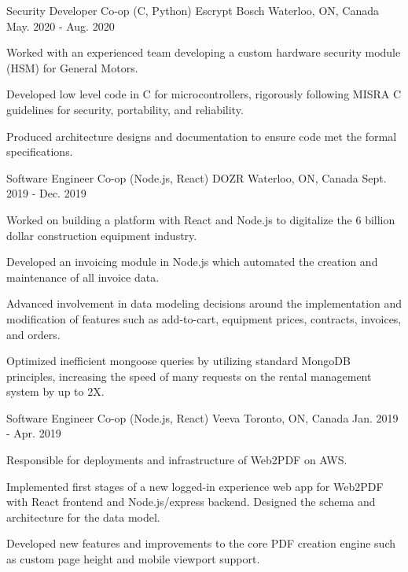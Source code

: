 \begin{cventries}
  \cventry
    {Security Developer Co-op (C, Python)} %
    {Escrypt Bosch} %
    {Waterloo, ON, Canada} %
    {May. 2020 - Aug. 2020} %
    {
      \begin{cvitems} %
\item Worked with an experienced team developing a custom hardware security module (HSM) for General Motors.
\item Developed low level code in C for microcontrollers, rigorously following MISRA C guidelines for security, portability, and reliability.
\item Produced architecture designs and documentation to ensure code met the formal specifications.
      \end{cvitems}
    }

  \cventry
    {Software Engineer Co-op (Node.js, React)} %
    {DOZR} %
    {Waterloo, ON, Canada} %
    {Sept. 2019 - Dec. 2019} %
    {
      \begin{cvitems} %
\item Worked on building a platform with React and Node.js to digitalize the 6 billion dollar construction equipment industry.
\item Developed an invoicing module in Node.js which automated the creation and maintenance of all invoice data.
\item Advanced involvement in data modeling decisions around the implementation and modification of features such as add-to-cart, equipment prices, contracts, invoices, and orders.
\item Optimized inefficient mongoose queries by utilizing standard MongoDB principles, increasing the speed of many requests on the rental management system by up to 2X.
      \end{cvitems}
    }

  \cventry
    {Software Engineer Co-op (Node.js, React)} %
    {Veeva} %
    {Toronto, ON, Canada} %
    {Jan. 2019 - Apr. 2019} %
    {
      \begin{cvitems} %
\item Responsible for deployments and infrastructure of Web2PDF on AWS.
\item Implemented first stages of a new logged-in experience web app for Web2PDF with React frontend and Node.js/express backend. Designed the schema and architecture for the data model.
\item Developed new features and improvements to the core PDF creation engine such as custom page height and mobile viewport support.
      \end{cvitems}
    }


\end{cventries}
